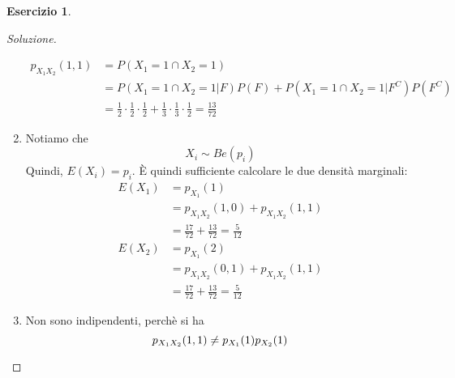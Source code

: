 \documentclass{article}
\theoremstyle{plain}
\theoremstyle{definition}
\newtheorem{esercizio}{Esercizio}[section]
\theoremstyle{remark}
\newenvironment{soluzione}
	{\renewcommand\qedsymbol{$\mathwitch*$}\begin{proof}[Soluzione]}
	{\end{proof}}
\renewcommand{\qedsymbol}{$\mathrightghost$}
\begin{document}
\begin{esercizio}
\begin{soluzione}
\begin{enumerate}
\begin{align*}
				p_{X_1X_2}(1,1)&=P(X_1=1\cap X_2=1)\\
				&=P(X_1=1\cap X_2=1|F)P(F)+P(X_1=1\cap X_2=1|F^C)P(F^C)\\
				&=\frac{1}{2}\cdot\frac{1}{2}\cdot\frac{1}{2}+\frac{1}{3}\cdot\frac{1}{3}\cdot\frac{1}{2}=\frac{13}{72}
			\end{align*}
			\item Notiamo che
			\begin{equation*}
				X_i\sim Be(p_i)
			\end{equation*}
			Quindi, $E(X_i)=p_i$. È quindi sufficiente calcolare le due densità marginali:
			\begin{align*}
				E(X_1)&=p_{X_1}(1)\\
				&=p_{X_1X_2}(1,0)+p_{X_1X_2}(1,1)\\
				&=\frac{17}{72}+\frac{13}{72}=\frac{5}{12}\\
				E(X_2)&=p_{X_1}(2)\\
				&=p_{X_1X_2}(0,1)+p_{X_1X_2}(1,1)\\
				&=\frac{17}{72}+\frac{13}{72}=\frac{5}{12}
			\end{align*}
			\item Non sono indipendenti, perchè si ha
			\begin{equation*}
				p_{X_1X_2}(1,1)\neq p_{X_1}(1)p_{X_2}(1)\qedhere
			\end{equation*}
		\end{enumerate}
	\end{soluzione}
\end{esercizio}
\end{document}
